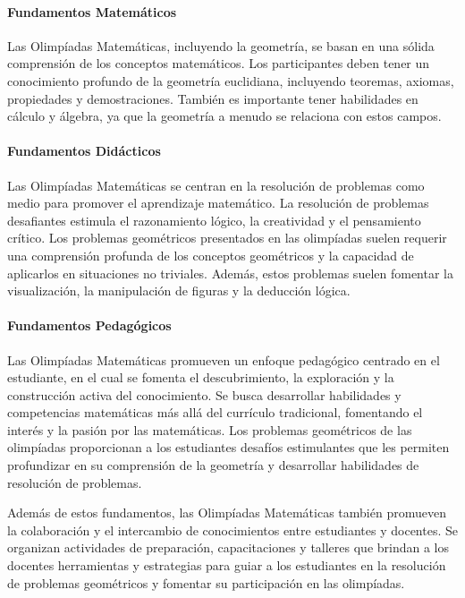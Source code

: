 \paragraph{Fundamentos Matemáticos}

Las Olimpíadas Matemáticas, incluyendo la geometría, se basan en una sólida comprensión de los conceptos matemáticos. Los participantes deben tener un conocimiento profundo de la geometría euclidiana, incluyendo teoremas, axiomas, propiedades y demostraciones. También es importante tener habilidades en cálculo y álgebra, ya que la geometría a menudo se relaciona con estos campos.

\paragraph{Fundamentos Didácticos}

Las Olimpíadas Matemáticas se centran en la resolución de problemas como medio para promover el aprendizaje matemático. La resolución de problemas desafiantes estimula el razonamiento lógico, la creatividad y el pensamiento crítico. Los problemas geométricos presentados en las olimpíadas suelen requerir una comprensión profunda de los conceptos geométricos y la capacidad de aplicarlos en situaciones no triviales. Además, estos problemas suelen fomentar la visualización, la manipulación de figuras y la deducción lógica.

\paragraph{Fundamentos Pedagógicos}

Las Olimpíadas Matemáticas promueven un enfoque pedagógico centrado en el estudiante, en el cual se fomenta el descubrimiento, la exploración y la construcción activa del conocimiento. Se busca desarrollar habilidades y competencias matemáticas más allá del currículo tradicional, fomentando el interés y la pasión por las matemáticas. Los problemas geométricos de las olimpíadas proporcionan a los estudiantes desafíos estimulantes que les permiten profundizar en su comprensión de la geometría y desarrollar habilidades de resolución de problemas.

Además de estos fundamentos, las Olimpíadas Matemáticas también promueven la colaboración y el intercambio de conocimientos entre estudiantes y docentes. Se organizan actividades de preparación, capacitaciones y talleres que brindan a los docentes herramientas y estrategias para guiar a los estudiantes en la resolución de problemas geométricos y fomentar su participación en las olimpíadas.

